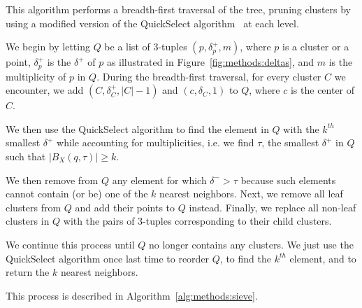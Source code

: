 This algorithm performs a breadth-first traversal of the tree, pruning clusters by using a modified version of the QuickSelect algorithm~\cite{hoare1961algorithm} at each level.

We begin by letting $Q$ be a list of 3-tuples $(p, \delta^{+}_{p}, m)$, where $p$ is a cluster or a point, $\delta^{+}_{p}$ is the $\delta^{+}$ of $p$ as illustrated in Figure~\ref{fig:methods:deltas}, and $m$ is the multiplicity of $p$ in $Q$.
During the breadth-first traversal, for every cluster $C$ we encounter, we add $(C, \delta^{+}_{C}, |C| - 1)$ and $(c, \delta_{C}, 1)$ to $Q$, where $c$ is the center of $C$.

We then use the QuickSelect algorithm to find the element in $Q$ with the $k^{th}$ smallest $\delta^{+}$ while accounting for multiplicities, i.e. we find $\tau$, the smallest $\delta^{+}$ in $Q$ such that $\left| B_X(q, \tau) \right| \geq k$.

We then remove from $Q$ any element for which $\delta^{-} > \tau$ because such elements cannot contain (or be) one of the $k$ nearest neighbors.
Next, we remove all leaf clusters from $Q$ and add their points to $Q$ instead.
Finally, we replace all non-leaf clusters in $Q$ with the pairs of 3-tuples corresponding to their child clusters.

We continue this process until $Q$ no longer contains any clusters.
We just use the QuickSelect algorithm once last time to reorder $Q$, to find the $k^{th}$ element, and to return the $k$ nearest neighbors.

This process is described in Algorithm~\ref{alg:methods:sieve}. 

